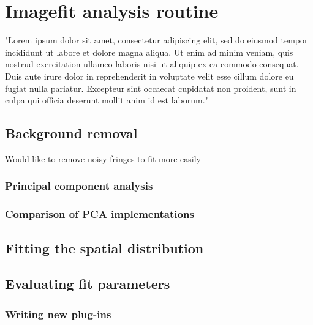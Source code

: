 \chapter{Imagefit analysis routine}
"Lorem ipsum dolor sit amet, consectetur adipiscing elit, sed do eiusmod tempor incididunt ut labore et dolore magna aliqua. Ut enim ad minim veniam, quis nostrud exercitation ullamco laboris nisi ut aliquip ex ea commodo consequat. Duis aute irure dolor in reprehenderit in voluptate velit esse cillum dolore eu fugiat nulla pariatur. Excepteur sint occaecat cupidatat non proident, sunt in culpa qui officia deserunt mollit anim id est laborum."

\section{Background removal}
Would like to remove noisy fringes to fit more easily

\subsection{Principal component analysis}

\subsection{Comparison of PCA implementations}

\section{Fitting the spatial distribution}

\section{Evaluating fit parameters}

\subsection{Writing new plug-ins}